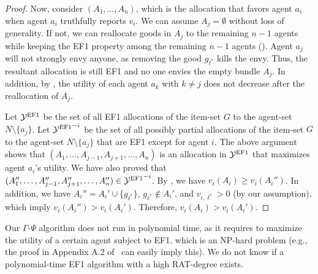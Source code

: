 \begin{proof}
Now, consider $(A_1,\ldots,A_n)$, which is the allocation that favors agent $a_i$ when agent $a_i$ truthfully reports $v_i$.
We can assume $A_j=\emptyset$ without loss of generality.
If not, we can reallocate goods in $A_j$ to the remaining $n-1$ agents while keeping the EF1 property among the remaining $n-1$ agents ().
Agent $a_j$ will not strongly envy anyone, as removing the good $g_{\ell^\ast}$ kills the envy.
Thus, the resultant allocation is still EF1 and no one envies the empty bundle $A_j$.
In addition, by , the utility of each agent $a_k$ with $k\neq j$ does not decrease after the reallocation of $A_j$.

Let ${\mathcal{Y}^{\mathrm{EF1}}}$ be the set of all EF1 allocations of the item-set $G$ to the agent-set $N\setminus\{a_j\}$.
Let ${\mathcal{Y}^{\mathrm{EF1}}}^{-i}$ be the set of all possibly partial allocations of the item-set $G$ to the agent-set $N\setminus\{a_j\}$ that are EF1 except for agent $i$.
The above argument shows that $(A_1,\ldots,A_{j-1},A_{j+1},\ldots,A_n)$ is an allocation in ${\mathcal{Y}^{\mathrm{EF1}}}$ that maximizes agent $a_i$'s utility.
We have also proved that $(A_1'',\ldots,A_{j-1}'',A_{j+1}'',\ldots,A_n'')\in {\mathcal{Y}^{\mathrm{EF1}}}^{-i}$.
By , we have $v_i(A_i)\geq v_i(A_i'')$.
In addition, we have $A_i''=A_i'\cup\{g_{\ell^\ast}\}$, $g_{\ell^\ast}\notin A_i'$, and $v_{i,\ell^\ast}>0$ (by our assumption), which imply $v_i(A_i'')>v_i(A_i')$.
Therefore, $v_i(A_i)>v_i(A_i')$.
\end{proof}

\begin{remark}
Our $\Gamma$-$\Psi$ algorithm does not run in polynomial time, as it requires to maximize the utility of a certain agent subject to EF1. which is %
an NP-hard problem (e.g., the proof in Appendix A.2 of~\citet{barman2019fair} can easily imply this).
We do not know if a polynomial-time EF1 algorithm with a high RAT-degree exists.
\end{remark}